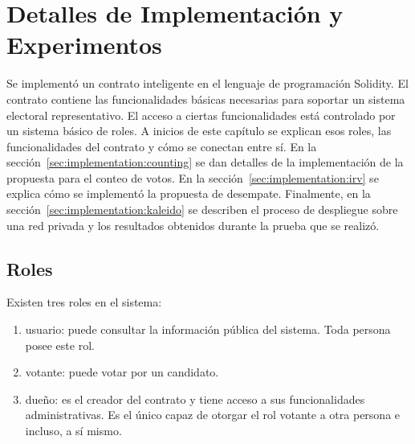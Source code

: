 \chapter{Detalles de Implementación y Experimentos}\label{chapter:implementation}

Se implement\'o un contrato inteligente en el lenguaje de programaci\'on Solidity. El contrato contiene las funcionalidades b\'asicas necesarias para soportar un sistema electoral representativo. El acceso a ciertas funcionalidades est\'a controlado por un sistema b\'asico de roles. A inicios de este cap\'itulo se explican esos roles, las funcionalidades del contrato y c\'omo se conectan entre s\'i. En la secci\'on~\ref{sec:implementation:counting} se dan detalles de la implementaci\'on de la propuesta para el conteo de votos. En la secci\'on~\ref{sec:implementation:irv} se explica c\'omo se implement\'o la propuesta  de desempate. Finalmente, en la secci\'on~\ref{sec:implementation:kaleido} se describen el proceso de despliegue sobre una red privada y los resultados obtenidos durante la prueba que se realiz\'o.

\section{Roles}
Existen tres roles en el sistema: 
\begin{enumerate}
    \item usuario: puede consultar la informaci\'on p\'ublica del sistema. Toda persona posee este rol.
    \item votante: puede votar por un candidato. 
    \item due\~no: es el creador del contrato y tiene acceso a sus funcionalidades administrativas. Es el \'unico capaz de otorgar el rol votante a otra persona e incluso, a s\'i mismo. 
\end{enumerate}

